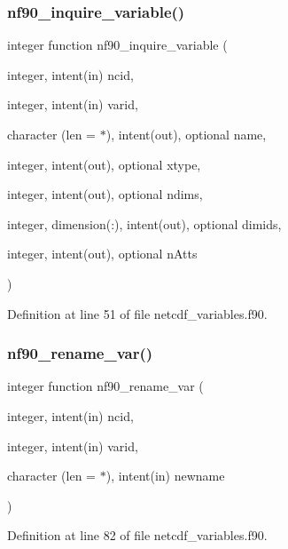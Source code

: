 \subsubsection{\texorpdfstring{nf90\+\_\+inquire\+\_\+variable()}{nf90\_inquire\_variable()}}
{\footnotesize\ttfamily integer function nf90\+\_\+inquire\+\_\+variable (\begin{DoxyParamCaption}\item[{integer, intent(in)}]{ncid,  }\item[{integer, intent(in)}]{varid,  }\item[{character (len = $\ast$), intent(out), optional}]{name,  }\item[{integer, intent(out), optional}]{xtype,  }\item[{integer, intent(out), optional}]{ndims,  }\item[{integer, dimension(\+:), intent(out), optional}]{dimids,  }\item[{integer, intent(out), optional}]{n\+Atts }\end{DoxyParamCaption})}



Definition at line 51 of file netcdf\+\_\+variables.\+f90.

\mbox{\label{netcdf__variables_8f90_aa3779419b3894a821cca28e761077b2c}} 
\subsubsection{\texorpdfstring{nf90\+\_\+rename\+\_\+var()}{nf90\_rename\_var()}}
{\footnotesize\ttfamily integer function nf90\+\_\+rename\+\_\+var (\begin{DoxyParamCaption}\item[{integer, intent(in)}]{ncid,  }\item[{integer, intent(in)}]{varid,  }\item[{character (len = $\ast$), intent(in)}]{newname }\end{DoxyParamCaption})}



Definition at line 82 of file netcdf\+\_\+variables.\+f90.


